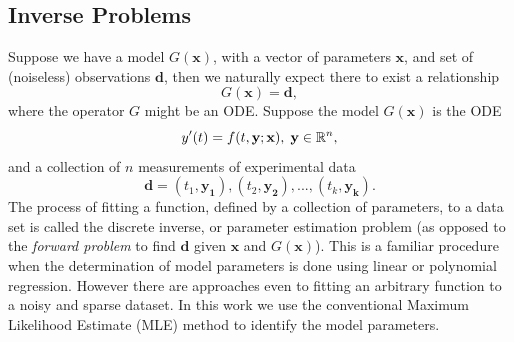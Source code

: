 \documentclass[12pt,a4paper,oneside]{book}
\begin{document}
\subsection{Inverse Problems}
Suppose we have a model $G(\mathbf{x})$, with a vector of parameters $\mathbf{x}$, and set of (noiseless) observations $\mathbf{d}$, then we naturally expect there to exist a relationship 
\[G(\mathbf{x}) = \mathbf{d} ,\]
where the operator $G$ might be an ODE. Suppose the model $G(\mathbf{x})$ is the ODE
\[ y'(t) = f(t, \mathbf{y}; \mathbf{x}), \hspace{1 mm}  \mathbf{y} \in \mathbb{R}^n, \]
and a collection of $n$ measurements of experimental data
\[ \mathbf{d} = \left( t_1, \mathbf{y_1} \right), 
\left( t_2, \mathbf{y_2} \right), ... ,
\left( t_k, \mathbf{y_k} \right).\]
The process of fitting a function, defined by a collection of parameters, to a data set is called the discrete inverse, or parameter estimation problem (as opposed to the \emph{forward problem} to find $\mathbf{d}$ given $\mathbf{x}$ and $G(\mathbf{x})$). This is a familiar procedure when the determination of model parameters is done using linear or polynomial regression. However there are approaches even to fitting an arbitrary function to a noisy and sparse dataset. In this work we use the conventional Maximum Likelihood Estimate (MLE) method to identify the model parameters.
\end{document}
